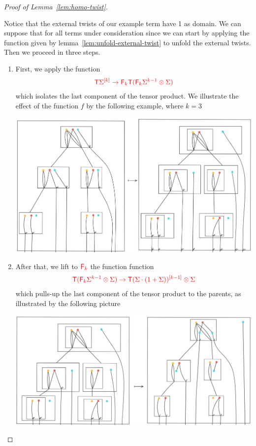 \begin{proof}[Proof of Lemma~\ref{lem:homo-twist}]
\begin{center}
\end{center} 
Notice that the external twists of our example term have 1 as domain. We can suppose that for all terms under consideration since we can start by applying the function given by lemma~\ref{lem:unfold-external-twist} to unfold the external twists.  Then we proceed in three steps. 
\begin{enumerate}
\item First, we apply the function
\begin{align*}
\ranked{\tmonad \mati k \Sigma \to \reduce k \tmonad(\reduce k\Sigma^{k-1}\otimes \Sigma)}
\end{align*} 
which isolates the last component of the tensor product. We illustrate the effect of the function $f$ by the following example, where $k=3$
\begin{center}
\includegraphics[scale=.1]{MyPic20.jpg}
\end{center}
\item After that, we lift to $\reduce k$ the function function
\begin{align*}
\ranked{\tmonad(\reduce k\Sigma^{k-1}\otimes \Sigma) \to \tmonad\mati {k-1} {(\Sigma\cdot(1+\Sigma))}\otimes \Sigma}
\end{align*}
which pulls-up the last component of the tensor product to the parents, as illustrated by the following picture 
\begin{center}
\includegraphics[scale=.12]{MyPic21.jpg}

\end{center}
\end{enumerate}
\end{proof}
